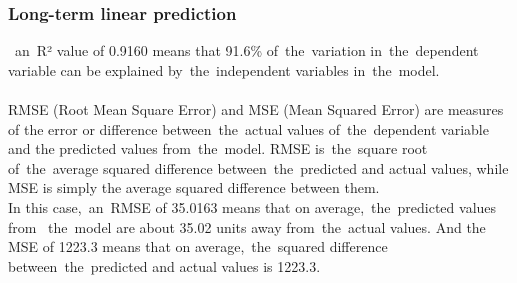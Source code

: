    \subsubsection{Long-term linear prediction} \label{subsec:res_ltlp}
    ~an~R² value of 0.9160 means that 91.6\% of~the~variation in~the~dependent
    variable can be explained by~the~independent variables in~the~model.\\
    \\
    RMSE (Root Mean Square Error) and MSE (Mean Squared Error) are measures of the
    error or difference between~the~actual values of~the~dependent variable and the
    predicted values from~the~model. RMSE is~the~square root of~the~average squared
    difference between~the~predicted and actual values, while MSE is simply the
    average squared difference between them.\\
    \newpage
    In this case,~an~RMSE of 35.0163 means that on average,~the~predicted values from
    ~the~model are about 35.02 units away from~the~actual values. And the
    MSE of 1223.3 means that on average,~the~squared difference between~the~predicted
    and actual values is 1223.3.
